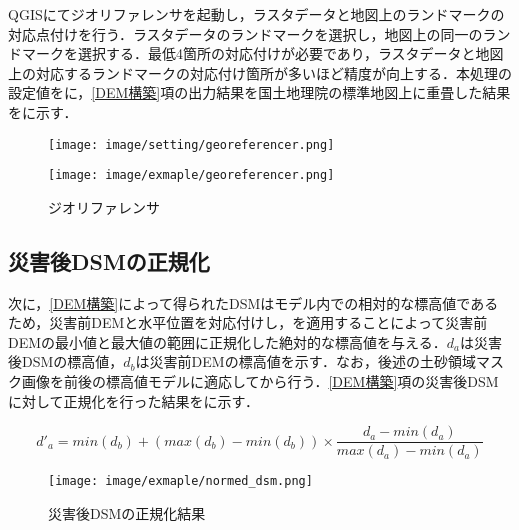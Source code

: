       QGISにてジオリファレンサを起動し，ラスタデータと地図上のランドマークの対応点付けを行う．ラスタデータのランドマークを選択し，地図上の同一のランドマークを選択する．最低4箇所の対応付けが必要であり，ラスタデータと地図上の対応するランドマークの対応付け箇所が多いほど精度が向上する．本処理の設定値をに，\ref{DEM構築}項の出力結果を国土地理院の標準地図\cite{標準地図}上に重畳した結果をに示す．

      \begin{figure}[t]
        \begin{minipage}[c]{0.45\hsize}
          \centering
          \texttt{[image: image/setting/georeferencer.png]}
          \label{ジオリファレンサ設定値}
        \end{minipage}
        \begin{minipage}[c]{0.45\hsize}
          \centering
          \texttt{[image: image/exmaple/georeferencer.png]}
          \label{ジオリファレンサ結果}
        \end{minipage}
        \caption{ジオリファレンサ}
      \end{figure}


    \subsection{災害後DSMの正規化}
      \label{災害後DSMの正規化}
      次に，\ref{DEM構築}によって得られたDSMはモデル内での相対的な標高値であるため，災害前DEMと水平位置を対応付けし，を適用することによって災害前DEMの最小値と最大値の範囲に正規化した絶対的な標高値を与える．$d_{a}$は災害後DSMの標高値，$d_{b}$は災害前DEMの標高値を示す．なお，後述の土砂領域マスク画像を前後の標高値モデルに適応してから行う．\ref{DEM構築}項の災害後DSMに対して正規化を行った結果をに示す．

      \begin{equation}
        \label{正規化}
        d'_{a} =  
          min(d_{b}) + (max(d_{b}) - min(d_{b})) \times
          \dfrac{d_{a} - min(d_{a})} {max(d_{a}) - min(d_{a})}
      \end{equation}

      \begin{figure}[t]
        \centering
        \texttt{[image: image/exmaple/normed\_dsm.png]}
        \caption{災害後DSMの正規化結果}
        \label{正規化結果}
      \end{figure}


